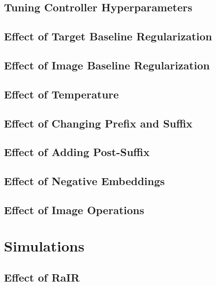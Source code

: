 \subsection{Tuning Controller Hyperparameters}
\label{sec:icem-hyperparameters}


\subsection{Effect of Target Baseline Regularization}
\label{sec:reg-alpha}


\subsection{Effect of Image Baseline Regularization}
\label{sec:reg-beta}


\subsection{Effect of Temperature}
\label{sec:reg-temperature}


\subsection{Effect of Changing Prefix and Suffix}
\label{sec:prefix-suffix}


\subsection{Effect of Adding Post-Suffix}
\label{sec:post-suffix}


\subsection{Effect of Negative Embeddings}
\label{sec:negative-embeddings}


\subsection{Effect of Image Operations}
\label{sec:image-operations}



\section{Simulations}
\label{sec:simulations}


\subsection{Effect of RaIR}
\label{sec:effect-rair}

